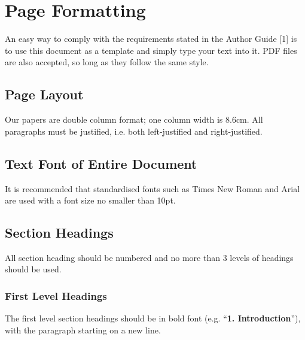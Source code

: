 \documentclass{cta-author}
\begin{document}
\section{Page Formatting}\label{sec5}

An easy way to comply with the requirements stated in the
Author Guide [1] is to use this document as a template and
simply type your text into it. PDF files are also accepted,
so long as they follow the same style.

\subsection{Page Layout}\label{subsec5.1}

Our papers are double column format; one column width is
8.6cm. All paragraphs must be justified, i.e. both
left-justified and right-justified.

\subsection{Text Font of Entire Document}\label{subsec5.2}


It is recommended that standardised fonts such as Times New
Roman and Arial are used with a font size no smaller than
10pt.

\subsection{Section Headings}\label{subsec5.3}

All section heading should be numbered and no more than 3
levels of headings should be used.

\subsubsection{First Level Headings}\label{subsubsec5.3.1} The first level section headings
should be in bold font (e.g. ``\textbf{1. Introduction}''),
with the paragraph starting on a new line.
\end{document}
